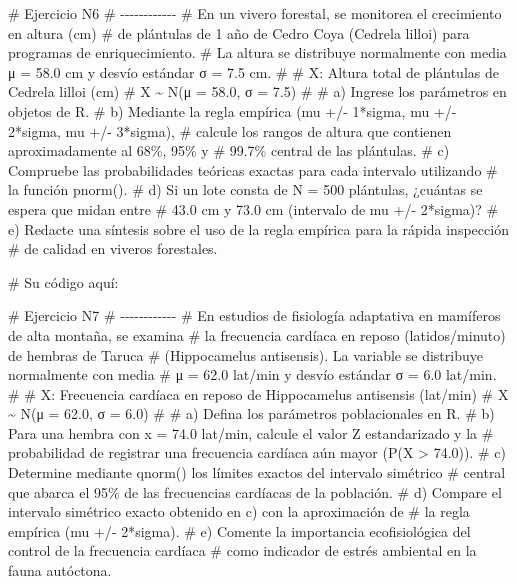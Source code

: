 \documentclass[
  spanish,
  letterpaper,
  DIV=11,
  numbers=noendperiod]{scrreprt}
\newenvironment{Shaded}{\begin{snugshade}}{\end{snugshade}}
\newcommand{\CommentTok}[1]{\textcolor[rgb]{0.37,0.37,0.37}{#1}}
\begin{document}
\begin{Shaded}
\begin{Highlighting}[]
\CommentTok{\# Ejercicio N6}
\CommentTok{\# {-}{-}{-}{-}{-}{-}{-}{-}{-}{-}{-}{-}}
\CommentTok{\# En un vivero forestal, se monitorea el crecimiento en altura (cm)}
\CommentTok{\# de plántulas de 1 año de Cedro Coya (Cedrela lilloi) para programas de enriquecimiento.}
\CommentTok{\# La altura se distribuye normalmente con media μ = 58.0 cm y desvío estándar σ = 7.5 cm.}
\CommentTok{\#}
\CommentTok{\#  X: Altura total de plántulas de Cedrela lilloi (cm)}
\CommentTok{\#  X \textasciitilde{} N(μ = 58.0, σ = 7.5)}
\CommentTok{\#}
\CommentTok{\# a) Ingrese los parámetros en objetos de R.}
\CommentTok{\# b) Mediante la regla empírica (mu +/{-} 1*sigma, mu +/{-} 2*sigma, mu +/{-} 3*sigma),}
\CommentTok{\#    calcule los rangos de altura que contienen aproximadamente al 68\%, 95\% y}
\CommentTok{\#    99.7\% central de las plántulas.}
\CommentTok{\# c) Compruebe las probabilidades teóricas exactas para cada intervalo utilizando}
\CommentTok{\#    la función pnorm().}
\CommentTok{\# d) Si un lote consta de N = 500 plántulas, ¿cuántas se espera que midan entre}
\CommentTok{\#    43.0 cm y 73.0 cm (intervalo de mu +/{-} 2*sigma)?}
\CommentTok{\# e) Redacte una síntesis sobre el uso de la regla empírica para la rápida inspección}
\CommentTok{\#    de calidad en viveros forestales.}

\CommentTok{\# Su código aquí:}


\CommentTok{\# Ejercicio N7}
\CommentTok{\# {-}{-}{-}{-}{-}{-}{-}{-}{-}{-}{-}{-}}
\CommentTok{\# En estudios de fisiología adaptativa en mamíferos de alta montaña, se examina}
\CommentTok{\# la frecuencia cardíaca en reposo (latidos/minuto) de hembras de Taruca}
\CommentTok{\# (Hippocamelus antisensis). La variable se distribuye normalmente con media}
\CommentTok{\# μ = 62.0 lat/min y desvío estándar σ = 6.0 lat/min.}
\CommentTok{\#}
\CommentTok{\#  X: Frecuencia cardíaca en reposo de Hippocamelus antisensis (lat/min)}
\CommentTok{\#  X \textasciitilde{} N(μ = 62.0, σ = 6.0)}
\CommentTok{\#}
\CommentTok{\# a) Defina los parámetros poblacionales en R.}
\CommentTok{\# b) Para una hembra con x = 74.0 lat/min, calcule el valor Z estandarizado y la}
\CommentTok{\#    probabilidad de registrar una frecuencia cardíaca aún mayor (P(X \textgreater{} 74.0)).}
\CommentTok{\# c) Determine mediante qnorm() los límites exactos del intervalo simétrico}
\CommentTok{\#    central que abarca el 95\% de las frecuencias cardíacas de la población.}
\CommentTok{\# d) Compare el intervalo simétrico exacto obtenido en c) con la aproximación de}
\CommentTok{\#    la regla empírica (mu +/{-} 2*sigma).}
\CommentTok{\# e) Comente la importancia ecofisiológica del control de la frecuencia cardíaca}
\CommentTok{\#    como indicador de estrés ambiental en la fauna autóctona.}


\end{Highlighting}
\end{Shaded}
\end{document}
